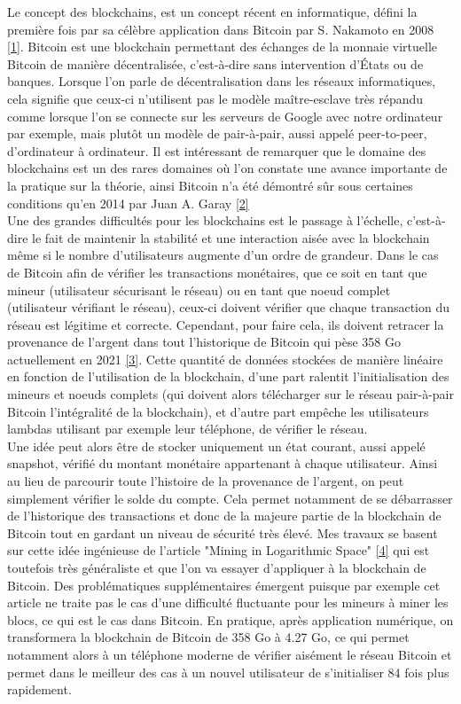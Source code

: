 \documentclass[12pt,a4paper]{article}
\newcommand{\source}[1]{\hyperlink{#1}{[#1]}}
\begin{document}
	Le concept des blockchains, est un concept récent en informatique, défini la première fois par sa célèbre application dans Bitcoin par S. Nakamoto en 2008 \source{1}. Bitcoin est une blockchain permettant des échanges de la monnaie virtuelle Bitcoin de manière décentralisée, c'est-à-dire sans intervention d'États ou de banques. Lorsque l'on parle de décentralisation dans les réseaux informatiques, cela signifie que ceux-ci n'utilisent pas le modèle maître-esclave très répandu comme lorsque l'on se connecte sur les serveurs de Google avec notre ordinateur par exemple, mais plutôt un modèle de pair-à-pair, aussi appelé peer-to-peer, d'ordinateur à ordinateur. Il est intéressant de remarquer que le domaine des blockchains est un des rares domaines où l'on constate une avance importante de la pratique sur la théorie, ainsi Bitcoin n'a été démontré sûr sous certaines conditions qu'en 2014 par Juan A. Garay \source{2}\\
	Une des grandes difficultés pour les blockchains est le passage à l'échelle, c'est-à-dire le fait de maintenir la stabilité et une interaction aisée avec la blockchain même si le nombre d'utilisateurs augmente d'un ordre de grandeur. Dans le cas de Bitcoin afin de vérifier les transactions monétaires, que ce soit en tant que mineur (utilisateur sécurisant le réseau) ou en tant que noeud complet (utilisateur vérifiant le réseau), ceux-ci doivent vérifier que chaque transaction du réseau est légitime et correcte. Cependant, pour faire cela, ils doivent retracer la provenance de l'argent dans tout l'historique de Bitcoin qui pèse 358 Go actuellement en 2021 \source{3}. Cette quantité de données stockées de manière linéaire en fonction de l'utilisation de la blockchain, d'une part ralentit l'initialisation des mineurs et noeuds complets (qui doivent alors télécharger sur le réseau pair-à-pair Bitcoin l'intégralité de la blockchain), et d'autre part empêche les utilisateurs lambdas utilisant par exemple leur téléphone, de vérifier le réseau.\\ %
	Une idée peut alors être de stocker uniquement un état courant, aussi appelé snapshot, vérifié du montant monétaire appartenant à chaque utilisateur. Ainsi au lieu de parcourir toute l'histoire de la provenance de l'argent, on peut simplement vérifier le solde du compte. Cela permet notamment de se débarrasser de l'historique des transactions et donc de la majeure partie de la blockchain de Bitcoin tout en gardant un niveau de sécurité très élevé. Mes travaux se basent sur cette idée ingénieuse de l'article "Mining in Logarithmic Space" \source{4} qui est toutefois très généraliste et que l'on va essayer d'appliquer à la blockchain de Bitcoin. Des problématiques supplémentaires émergent puisque par exemple cet article ne traite pas le cas d'une difficulté fluctuante pour les mineurs à miner les blocs, ce qui est le cas dans Bitcoin. En pratique, après application numérique, on transformera la blockchain de Bitcoin de 358 Go à 4.27 Go, ce qui permet notamment alors à un téléphone moderne de vérifier aisément le réseau Bitcoin et permet dans le meilleur des cas à un nouvel utilisateur de s'initialiser 84 fois plus rapidement.\\
\end{document}
